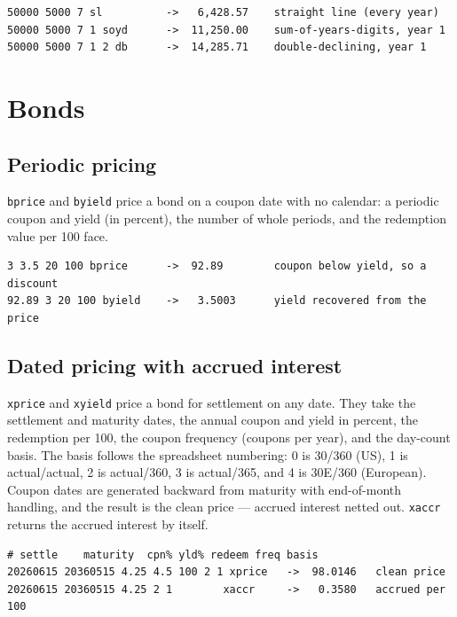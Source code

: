 \documentclass[11pt]{article}
\newcommand{\w}[1]{\texttt{#1}}
\begin{document}
\begin{lstlisting}
50000 5000 7 sl          ->   6,428.57    straight line (every year)
50000 5000 7 1 soyd      ->  11,250.00    sum-of-years-digits, year 1
50000 5000 7 1 2 db      ->  14,285.71    double-declining, year 1
\end{lstlisting}

\section{Bonds}

\subsection{Periodic pricing}

\w{bprice} and \w{byield} price a bond on a coupon date with no calendar: a
periodic coupon and yield (in percent), the number of whole periods, and the
redemption value per 100 face.

\begin{lstlisting}
3 3.5 20 100 bprice      ->  92.89        coupon below yield, so a discount
92.89 3 20 100 byield    ->   3.5003      yield recovered from the price
\end{lstlisting}

\subsection{Dated pricing with accrued interest}

\w{xprice} and \w{xyield} price a bond for settlement on any date. They take
the settlement and maturity dates, the annual coupon and yield in percent, the
redemption per 100, the coupon frequency (coupons per year), and the day-count
basis. The basis follows the spreadsheet numbering: 0 is 30/360 (US), 1 is
actual/actual, 2 is actual/360, 3 is actual/365, and 4 is 30E/360 (European).
Coupon dates are generated backward from maturity with end-of-month handling,
and the result is the clean price --- accrued interest netted out. \w{xaccr}
returns the accrued interest by itself.

\begin{lstlisting}
# settle    maturity  cpn% yld% redeem freq basis
20260615 20360515 4.25 4.5 100 2 1 xprice   ->  98.0146   clean price
20260615 20360515 4.25 2 1        xaccr     ->   0.3580   accrued per 100
\end{lstlisting}
\end{document}
